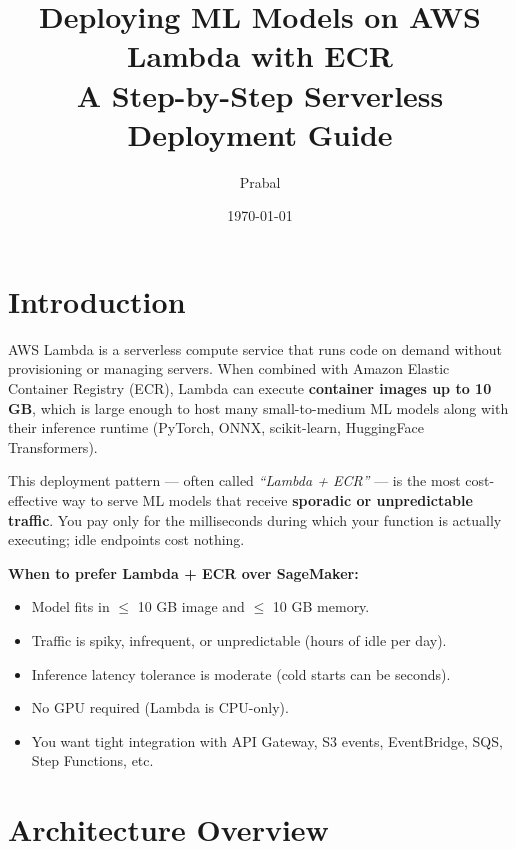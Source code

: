 \documentclass[11pt,a4paper]{article}
\title{\textbf{Deploying ML Models on AWS Lambda with ECR}\\
\large A Step-by-Step Serverless Deployment Guide}
\author{Prabal}
\date{\today}
\begin{document}
\maketitle
\tableofcontents
\newpage

\section{Introduction}

AWS Lambda is a serverless compute service that runs code on demand without
provisioning or managing servers. When combined with Amazon Elastic Container
Registry (ECR), Lambda can execute \textbf{container images up to 10 GB},
which is large enough to host many small-to-medium ML models along with their
inference runtime (PyTorch, ONNX, scikit-learn, HuggingFace Transformers).

This deployment pattern --- often called \emph{``Lambda + ECR''} --- is the
most cost-effective way to serve ML models that receive \textbf{sporadic or
unpredictable traffic}. You pay only for the milliseconds during which your
function is actually executing; idle endpoints cost nothing.

\begin{notebox}
\textbf{When to prefer Lambda + ECR over SageMaker:}
\begin{itemize}[leftmargin=*,nosep]
    \item Model fits in $\leq$ 10 GB image and $\leq$ 10 GB memory.
    \item Traffic is spiky, infrequent, or unpredictable (hours of idle per day).
    \item Inference latency tolerance is moderate (cold starts can be seconds).
    \item No GPU required (Lambda is CPU-only).
    \item You want tight integration with API Gateway, S3 events, EventBridge,
          SQS, Step Functions, etc.
\end{itemize}
\end{notebox}

\section{Architecture Overview}
\end{document}
